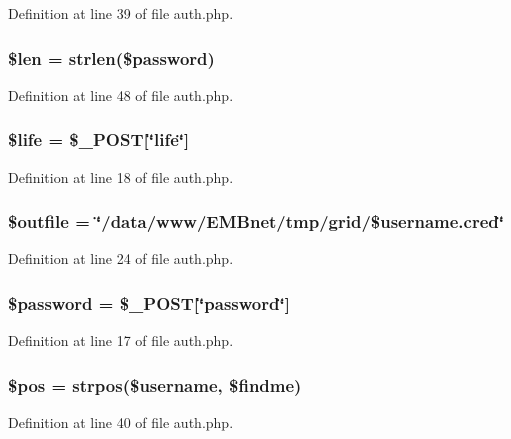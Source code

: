 Definition at line 39 of file auth.php.
\subsubsection{\setlength{\rightskip}{0pt plus 5cm}\$len = strlen(\$password)}\label{auth_8php_a8}




Definition at line 48 of file auth.php.
\subsubsection{\setlength{\rightskip}{0pt plus 5cm}\$life = \$\_\-POST[\char`\"{}life\char`\"{}]}\label{auth_8php_a2}




Definition at line 18 of file auth.php.
\subsubsection{\setlength{\rightskip}{0pt plus 5cm}\$outfile = \char`\"{}/data/www/EMBnet/tmp/grid/\$username.cred\char`\"{}}\label{auth_8php_a4}




Definition at line 24 of file auth.php.
\subsubsection{\setlength{\rightskip}{0pt plus 5cm}\$password = \$\_\-POST[\char`\"{}password\char`\"{}]}\label{auth_8php_a1}




Definition at line 17 of file auth.php.
\subsubsection{\setlength{\rightskip}{0pt plus 5cm}\$pos = strpos(\$username, \$findme)}\label{auth_8php_a7}




Definition at line 40 of file auth.php.
